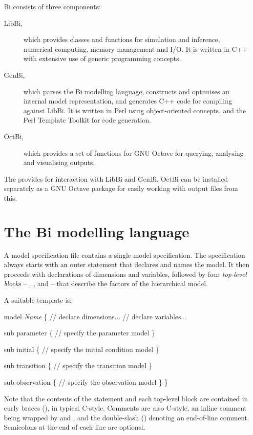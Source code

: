 Bi consists of three components:
\begin{description}
\item[LibBi,] which provides classes and functions for simulation
  and inference, numerical computing, memory management and I/O. It is written
  in C++ with extensive use of generic programming concepts.
\item[GenBi,] which parses the Bi modelling language, constructs
  and optimises an internal model representation, and generates C++ code for
  compiling against LibBi. It is written in Perl using object-oriented
  concepts, and the Perl Template Toolkit for code generation.
\item[OctBi,] which provides a set of functions for GNU Octave
  for querying, analysing and visualising outputs.
\end{description}

The  provides
for interaction with LibBi and GenBi. OctBi can be installed separately as a
GNU Octave package for easily working with output files from this.

\section{The Bi modelling language\label{Modelling_language}}

A model specification file contains a single model specification. The
specification always starts with an outer  statement that
declares and names the model. It then proceeds with declarations of dimensions
and variables, followed by four \emph{top-level blocks} --
, ,  and
 -- that describe the factors of the hierarchical model.

A suitable template is:
\begin{bicode}
model \textsl{Name} \{
  // declare dimensions...
  // declare variables...

  sub parameter \{
    // specify the parameter model
  \}

  sub initial \{
    // specify the initial condition model
  \}

  sub transition \{
    // specify the transition model
  \}

  sub observation \{
    // specify the observation model
  \}
\}
\end{bicode}

Note that the contents of the  statement and each top-level block
are contained in curly braces (\bitt{\{\(\ldots\)\}}), in typical
C-style. Comments are also C-style, an inline comment being wrapped by
\bitt{/*} and \bitt{*/}, and the double-slash (\bitt{//}) denoting an
end-of-line comment. Semicolons at the end of each line are optional.

